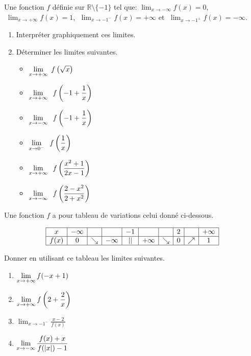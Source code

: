 \begin{exercice}
Une fonction $ f $ définie sur $\mathbb{R}\setminus\{-1\} $ tel que: $\displaystyle \lim_{x \to -\infty}f(x)=0 $,  $\; \displaystyle\lim_{x \to +\infty}f(x)=1$,  $\;\displaystyle \lim_{x \to -1^{-}}f(x)=+\infty $  et  $\; \displaystyle\lim_{x \to -1^{+}}f(x)=-\infty $. 
\begin{enumerate}
\item Interpréter graphiquement ces  limites.
\item Déterminer les limites suivantes.
\begin{itemize}
\item $\displaystyle \lim_{x \to+\infty}\; f\left(\sqrt{x}\right)$
\item $\displaystyle \lim_{x \to +\infty}\;\;f\left(-1+\frac{1}{x}\right)$
\item $\displaystyle \lim_{x \to -\infty}\;\;f\left(-1+\frac{1}{x}\right)$

\item $\displaystyle \lim_{x \to 0^{-}}\;\;f\left(\frac{1}{x}\right)$
\item $ \displaystyle\lim_{x \to +\infty}\;\;f\left(\frac{x^2+1}{2x-1}\right)$
\item $ \displaystyle\lim_{x \to -\infty}\;\;f\left(\frac{2-x^2}{2+x^2}\right)$
\end{itemize}

\end{enumerate}
\end{exercice}
\begin{exercice}
Une fonction $ f $ a pour tableau de variations celui donné ci-dessous.
\begin{center}
$$
\begin{array}{|c|c|c|c|c|c|c|c|c|c|}
\hline
x & -\infty & & & -1 & & & 2 & & +\infty \\
\hline
f(x) & 0 & \searrow & -\infty & || & +\infty & \searrow & 0 & \nearrow & 1 \\
\hline
\end{array}
$$
\end{center}


 Donner en utilisant ce tableau les limites suivantes.
\begin{enumerate}
\item $ \displaystyle\lim_{x \to +\infty}f(-x+1)$\item $ \displaystyle\lim_{x \to +\infty}f\left(2+\frac{2}{x}\right)$ \item $\displaystyle \lim_{x \to -1^-}\frac{x-2}{f(x)}$  \item $\displaystyle \lim_{x \to -\infty}\frac{f(x)+x}{f(|x|)-1}$ 
\end{enumerate}
\end{exercice}



